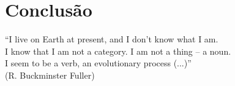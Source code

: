 \chapter{Conclusão}
\label{cap:coclusion}

\begin{flushright}
    ``I live on Earth at present, and I don’t know what I am. \\
    I know that I am not a category. I am not a thing -- a noun.\\ 
    I seem to be a verb, an evolutionary process (...)''\\[10px]
    (R. Buckminster Fuller)
    \end{flushright}


